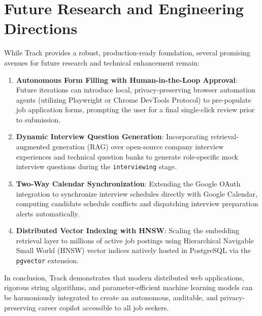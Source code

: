 \section{Future Research and Engineering Directions}
While Track provides a robust, production-ready foundation, several promising avenues for future research and technical enhancement remain:

\begin{enumerate}
    \item \textbf{Autonomous Form Filling with Human-in-the-Loop Approval}: Future iterations can introduce local, privacy-preserving browser automation agents (utilizing Playwright or Chrome DevTools Protocol) to pre-populate job application forms, prompting the user for a final single-click review prior to submission.
    \item \textbf{Dynamic Interview Question Generation}: Incorporating retrieval-augmented generation (RAG) over open-source company interview experiences and technical question banks to generate role-specific mock interview questions during the \texttt{interviewing} stage.
    \item \textbf{Two-Way Calendar Synchronization}: Extending the Google OAuth integration to synchronize interview schedules directly with Google Calendar, computing candidate schedule conflicts and dispatching interview preparation alerts automatically.
    \item \textbf{Distributed Vector Indexing with HNSW}: Scaling the embedding retrieval layer to millions of active job postings using Hierarchical Navigable Small World (HNSW) vector indices natively hosted in PostgreSQL via the \texttt{pgvector} extension.
\end{enumerate}

In conclusion, Track demonstrates that modern distributed web applications, rigorous string algorithms, and parameter-efficient machine learning models can be harmoniously integrated to create an autonomous, auditable, and privacy-preserving career copilot accessible to all job seekers.

